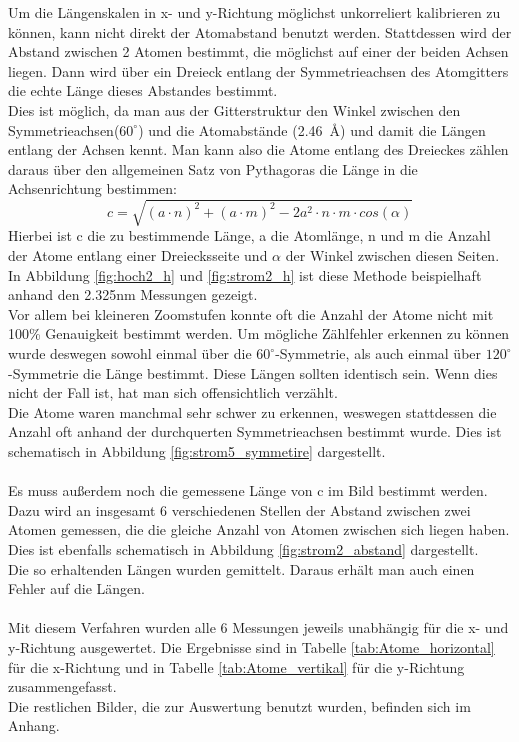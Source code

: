 \documentclass[12pt,a4paper]{article}
\begin{document}
Um die Längenskalen in x- und y-Richtung möglichst unkorreliert kalibrieren zu können, kann nicht direkt der Atomabstand benutzt werden. Stattdessen wird der Abstand zwischen 2 Atomen bestimmt, die möglichst auf einer der beiden Achsen liegen. Dann wird über ein Dreieck entlang der Symmetrieachsen des Atomgitters die echte Länge dieses Abstandes bestimmt.\\
Dies ist möglich, da man aus der Gitterstruktur den Winkel zwischen den Symmetrieachsen($60^{\circ}$) und die Atomabstände (\SI{2.46}{\angstrom}) und damit die Längen entlang der Achsen kennt. Man kann also die Atome entlang des Dreieckes zählen daraus über den allgemeinen Satz von Pythagoras die Länge in die Achsenrichtung bestimmen:
\begin{equation}
c = \sqrt{(a\cdot n)^{2}+(a\cdot m)^2-2 a^{2}\cdot n\cdot m\cdot cos(\alpha)}
\end{equation}
Hierbei ist c die zu bestimmende Länge, a die Atomlänge, n und m die Anzahl der Atome entlang einer Dreiecksseite und $\alpha$ der Winkel zwischen diesen Seiten.\\
In Abbildung \ref{fig:hoch2_h} und \ref{fig:strom2_h} ist diese Methode beispielhaft anhand den 2.325nm Messungen gezeigt.\\
Vor allem bei kleineren Zoomstufen konnte oft die Anzahl der Atome nicht mit 100\% Genauigkeit bestimmt werden.
Um mögliche Zählfehler erkennen zu können wurde deswegen sowohl einmal über die  $60^{\circ}$-Symmetrie, als auch einmal über $120^{\circ}$-Symmetrie die Länge bestimmt. Diese Längen sollten identisch sein. Wenn dies nicht der Fall ist, hat man sich offensichtlich verzählt.\\
Die Atome waren manchmal sehr schwer zu erkennen, weswegen stattdessen die Anzahl oft anhand der durchquerten Symmetrieachsen bestimmt wurde. Dies ist schematisch in Abbildung \ref{fig:strom5_symmetire} dargestellt.\\
\\
Es muss außerdem noch die gemessene Länge von c im Bild bestimmt werden.\\
Dazu wird an insgesamt 6 verschiedenen Stellen der Abstand zwischen zwei Atomen gemessen, die die gleiche Anzahl von Atomen zwischen sich liegen haben.
Dies ist ebenfalls schematisch in Abbildung \ref{fig:strom2_abstand} dargestellt.\\
Die so erhaltenden Längen wurden gemittelt. Daraus erhält man auch einen Fehler auf die Längen.\\
\\
Mit diesem Verfahren wurden alle 6 Messungen jeweils unabhängig für die x- und y-Richtung ausgewertet. Die Ergebnisse sind in Tabelle \ref{tab:Atome_horizontal} für die x-Richtung und in Tabelle \ref{tab:Atome_vertikal} für die y-Richtung zusammengefasst.\\
Die restlichen Bilder, die zur Auswertung benutzt wurden, befinden sich im Anhang.\\
\end{document}
